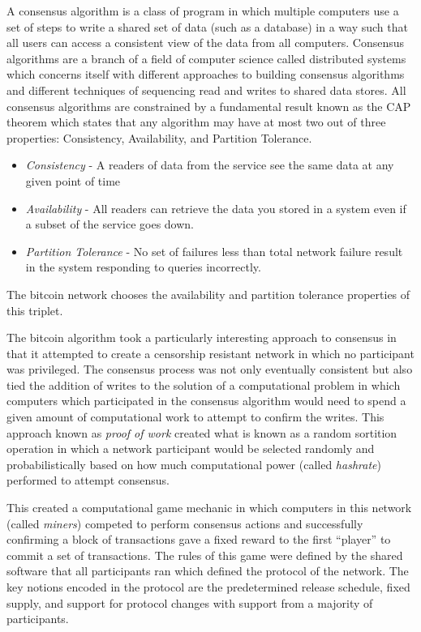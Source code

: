
A consensus algorithm is a class of program in which multiple computers
use a set of steps to write a shared set of data (such as a database) in
a way such that all users can access a consistent view of the data from
all computers. Consensus algorithms are a branch of a field of computer
science called distributed systems which concerns itself with different
approaches to building consensus algorithms and different techniques of
sequencing read and writes to shared data stores. All consensus
algorithms are constrained by a fundamental result known as the CAP
theorem which states that any algorithm may have at most two out of
three properties: Consistency, Availability, and Partition Tolerance.


\begin{itemize}
\tightlist
\item
  \textit{Consistency} - A readers of data from the service see the same data at
any given point of time
\item
  \textit{Availability} - All readers can retrieve the data
you stored in a system even if a subset of the service goes down.
\item
  \textit{Partition Tolerance} - No set of failures less than total network failure
result in the system responding to queries incorrectly.
\end{itemize}

The bitcoin network chooses the availability and partition tolerance properties
of this triplet.

The bitcoin algorithm took a particularly interesting approach to consensus in
that it attempted to create a censorship resistant network in which no
participant was privileged. The consensus process was not only eventually
consistent but also tied the addition of writes to the solution of a
computational problem in which computers which participated in the consensus
algorithm would need to spend a given amount of computational work to attempt to
confirm the writes. This approach known as \textit{proof of work} created what is known
as a random sortition operation in which a network participant would be selected
randomly and probabilistically based on how much computational power (called
\textit{hashrate}) performed to attempt consensus.


This created a computational game mechanic in which computers in this network
(called \textit{miners}) competed to perform consensus actions and successfully
confirming a block of transactions gave a fixed reward to the first ``player''
to commit a set of transactions. The rules of this game were defined by the
shared software that all participants ran which defined the protocol of the
network. The key notions encoded in the protocol are the predetermined release
schedule, fixed supply, and support for protocol changes with support from a
majority of participants.

